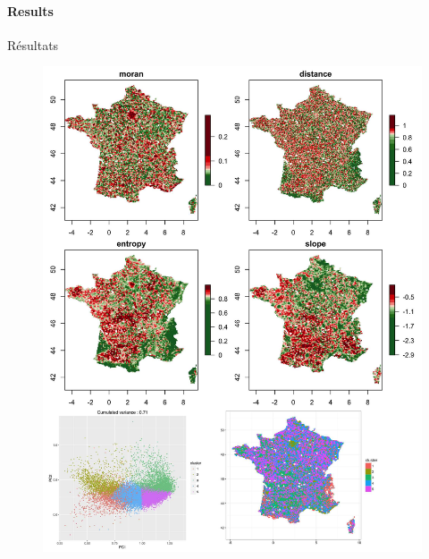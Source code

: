 \paragraph{Results}{Résultats}



\begin{figure}
\includegraphics[width=0.9\linewidth]{Figures/Final/4-1-1-fig-staticcorrelations-empirical}

\end{figure}
